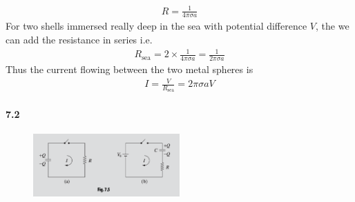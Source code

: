 \documentclass[../main.tex]{subfiles}
\begin{document}
\begin{itemize}
    \begin{align*}
        R = \frac{1}{4\pi\sigma a}
    \end{align*}
    For two shells immersed really deep in the sea with potential difference $V$, the
    we can add the resistance in series i.e.
    \begin{align*}
        R_\text{sea} = 2 \times \frac{1}{4\pi\sigma a} = \frac{1}{2\pi\sigma a}
    \end{align*}
    Thus the current flowing between the two metal spheres is
    \begin{align*}
        \boxed{I = \frac{V}{R_\text{sea}} = 2\pi\sigma a V}
    \end{align*}
\end{itemize}

\newpage
\paragraph{7.2}
\begin{figure}[ht]
    \centering
    \includegraphics[width=0.5\textwidth]{hw11_3.png}
\end{figure}
\end{document}
